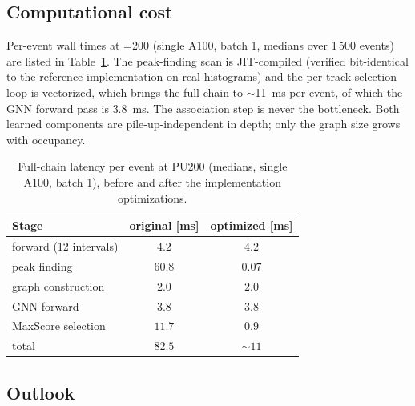 \subsection{Computational cost}
\label{sec:gnn:latency}

Per-event wall times at \muavg{}=200 (single A100, batch 1, medians over
1\,500 events) are listed in Table~\ref{tab:gnn_latency}. The peak-finding
scan is JIT-compiled (verified bit-identical to the reference implementation
on real histograms) and the per-track selection loop is vectorized, which
brings the full chain to $\sim$11~ms per event, of which the GNN forward pass
is $3.8$~ms. The association step is never the bottleneck. Both learned
components are pile-up-independent in depth; only the graph size grows with
occupancy.

\begin{table}[h]
  \centering
  \caption{Full-chain latency per event at PU200 (medians, single A100,
  batch 1), before and after the implementation optimizations.}
  \label{tab:gnn_latency}
  \begin{tabular}{lcc}
    \toprule
    Stage & original [ms] & optimized [ms] \\
    \midrule
    \pvf{} forward (12 intervals) & $4.2$ & $4.2$ \\
    peak finding                  & $60.8$ & $0.07$ \\
    graph construction            & $2.0$ & $2.0$ \\
    GNN forward                   & $3.8$ & $3.8$ \\
    MaxScore selection            & $11.7$ & $0.9$ \\
    \midrule
    total                         & $82.5$ & $\sim11$ \\
    \bottomrule
  \end{tabular}
\end{table}

\subsection{Outlook}
\label{sec:gnn:outlook}

